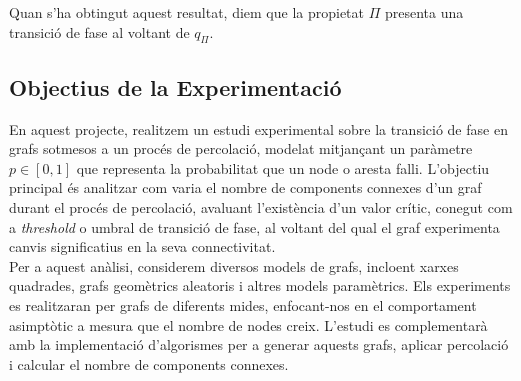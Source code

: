 \documentclass[a4paper]{article}
\begin{document}
	Quan s'ha obtingut aquest resultat, diem que la propietat $\Pi$ presenta una transició de fase al voltant de $q_{\Pi}$. \\
	
	\subsection{Objectius de la Experimentació}
	
	En aquest projecte, realitzem un estudi experimental sobre la transició de fase en grafs sotmesos a un procés de percolació, modelat mitjançant un paràmetre \( p \in [0, 1] \) que representa la probabilitat que un node o aresta falli. L'objectiu principal és analitzar com varia el nombre de components connexes d'un graf durant el procés de percolació, avaluant l'existència d'un valor crític, conegut com a \textit{threshold} o umbral de transició de fase, al voltant del qual el graf experimenta canvis significatius en la seva connectivitat. \\
	
	Per a aquest anàlisi, considerem diversos models de grafs, incloent xarxes quadrades, grafs geomètrics aleatoris i altres models paramètrics. Els experiments es realitzaran per grafs de diferents mides, enfocant-nos en el comportament asimptòtic a mesura que el nombre de nodes creix. L'estudi es complementarà amb la implementació d'algorismes per a generar aquests grafs, aplicar percolació i calcular el nombre de components connexes. \\
	
\end{document}
